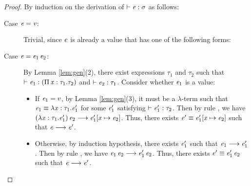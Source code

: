 \begin{proof}
    By induction on the derivation of $\vdash  \mathit{e}  :  \sigma$ as follows:
    \begin{description}
        \item[Case $\mathit{e}  =  \mathit{v}$:] Trivial, since $\mathit{e}$ is already a value that has one of the following forms:
		\begin{inparaenum}[(1)]
		    \item $\star$,
		    \item $\ottmv{x}$,
			\item $\lambda  \ottmv{x}  \ottsym{:}  \tau  \ottsym{.}  \ottnt{e}$,
			\item $\Pi \, \ottmv{x}  \ottsym{:}  \tau_{{\mathrm{1}}}  \ottsym{.}  \tau_{{\mathrm{2}}}$,
			\item $\kw{cast}^{\uparrow} \, \ottsym{[}  \tau  \ottsym{]}  \ottnt{e}$.
		\end{inparaenum}
		\item[Case $\mathit{e}=\mathit{e_{{\mathrm{1}}}} \, \mathit{e_{{\mathrm{2}}}}$:] By Lemma \ref{lem:gen}(2), there exist expressions $\tau_{{\mathrm{1}}}$ and $\tau_{{\mathrm{2}}}$ such that $\vdash  \mathit{e_{{\mathrm{1}}}}  :  (  \Pi \, \mathit{x}  :  \tau_{{\mathrm{1}}}  .  \tau_{{\mathrm{2}}}  )$ and $\vdash  \mathit{e_{{\mathrm{2}}}}  :  \tau_{{\mathrm{1}}}$. Consider whether $\mathit{e_{{\mathrm{1}}}}$ is a value:
    		\begin{itemize}
    		    \item If $\mathit{e_{{\mathrm{1}}}}=v$, by Lemma \ref{lem:gen}(3), it must be a $\lambda$-term such that $\mathit{e_{{\mathrm{1}}}}  \equiv  \lambda  \mathit{x}  :  \tau_{{\mathrm{1}}}  .  \mathit{e'_{{\mathrm{1}}}}$ for some $\mathit{e'_{{\mathrm{1}}}}$ satisfying $\vdash  \mathit{e'_{{\mathrm{1}}}}  :  \tau_{{\mathrm{2}}}$. Then by rule , we have $(  \lambda  \mathit{x}  :  \tau_{{\mathrm{1}}}  .  \mathit{e'_{{\mathrm{1}}}}  ) \, \mathit{e_{{\mathrm{2}}}}  \longrightarrow  \mathit{e'_{{\mathrm{1}}}}  [  \mathit{x}  \mapsto  \mathit{e_{{\mathrm{2}}}}  ]$. Thus, there exists $\mathit{e'}  \equiv  \mathit{e'_{{\mathrm{1}}}}  [  \mathit{x}  \mapsto  \mathit{e_{{\mathrm{2}}}}  ]$ such that $\mathit{e}  \longrightarrow  \mathit{e'}$.
    		    \item Otherwise, by induction hypothesis, there exists $\mathit{e'_{{\mathrm{1}}}}$ such that $\mathit{e_{{\mathrm{1}}}}  \longrightarrow  \mathit{e'_{{\mathrm{1}}}}$. Then by rule , we have $\mathit{e_{{\mathrm{1}}}} \, \mathit{e_{{\mathrm{2}}}}  \longrightarrow  \mathit{e'_{{\mathrm{1}}}} \, \mathit{e_{{\mathrm{2}}}}$. Thus, there exists $\mathit{e'}  \equiv  \mathit{e'_{{\mathrm{1}}}} \, \mathit{e_{{\mathrm{2}}}}$ such that $\mathit{e}  \longrightarrow  \mathit{e'}$.

\end{itemize}
\end{description}
\end{proof}
